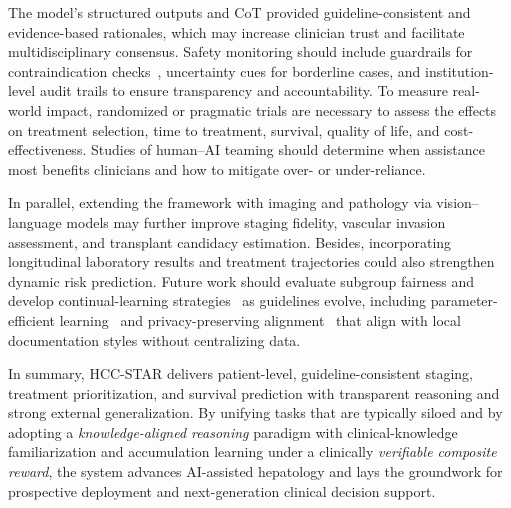 \documentclass{article}
\begin{document}
The model’s structured outputs and CoT provided guideline-consistent and evidence-based rationales, which may increase clinician trust and facilitate multidisciplinary consensus. Safety monitoring should include guardrails for contraindication checks~\cite{hager2024evaluation}, uncertainty cues\cite{banerji2023clinical} for borderline cases, and institution-level audit trails to ensure transparency and accountability. To measure real-world impact, randomized or pragmatic trials are necessary to assess the effects on treatment selection, time to treatment, survival, quality of life, and cost-effectiveness. Studies of human–AI teaming should determine when assistance most benefits clinicians and how to mitigate over- or under-reliance.


In parallel, extending the framework with imaging and pathology via vision–language models may further improve staging fidelity, vascular invasion assessment, and transplant candidacy estimation. Besides, incorporating longitudinal laboratory results and treatment trajectories could also strengthen dynamic risk prediction. Future work should evaluate subgroup fairness and develop continual-learning strategies~\cite{wang2025hide} as guidelines evolve, including parameter-efficient learning~\cite{ji2024towards} and privacy-preserving alignment~\cite{zhangstair} that align with local documentation styles without centralizing data.


In summary, {HCC-STAR} delivers patient-level, guideline-consistent staging, treatment prioritization, and survival prediction with transparent reasoning and strong external generalization. By unifying tasks that are typically siloed and by adopting a \emph{knowledge-aligned reasoning} paradigm with clinical-knowledge familiarization and accumulation learning under a clinically \emph{verifiable composite reward}, the system advances AI-assisted hepatology and lays the groundwork for prospective deployment and next-generation clinical decision support.



\end{document}
